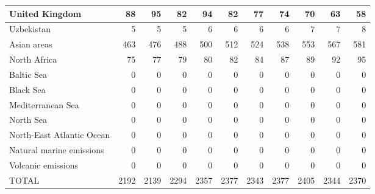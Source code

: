 \begin{table}
\begin{tabular}{|l|r|r|r|r|r|r|r|r|r|r|}
                United Kingdom&     88&     95&     82&     94&     82&     77&     74&     70&     63&     58\\\hline
                    Uzbekistan&      5&      5&      5&      6&      6&      6&      6&      7&      7&      8\\\hline
                   Asian areas&    463&    476&    488&    500&    512&    524&    538&    553&    567&    581\\\hline
                  North Africa&     75&     77&     79&     80&     82&     84&     87&     89&     92&     95\\\hline
                    Baltic Sea&      0&      0&      0&      0&      0&      0&      0&      0&      0&      0\\\hline
                     Black Sea&      0&      0&      0&      0&      0&      0&      0&      0&      0&      0\\\hline
             Mediterranean Sea&      0&      0&      0&      0&      0&      0&      0&      0&      0&      0\\\hline
                     North Sea&      0&      0&      0&      0&      0&      0&      0&      0&      0&      0\\\hline
     North-East Atlantic Ocean&      0&      0&      0&      0&      0&      0&      0&      0&      0&      0\\\hline
      Natural marine emissions&      0&      0&      0&      0&      0&      0&      0&      0&      0&      0\\\hline
            Volcanic emissions&      0&      0&      0&      0&      0&      0&      0&      0&      0&      0\\\hline\hline
                         TOTAL&   2192&   2139&   2294&   2357&   2377&   2343&   2377&   2405&   2344&   2370\\\hline
 \end{tabular}
 \end{table}
 
